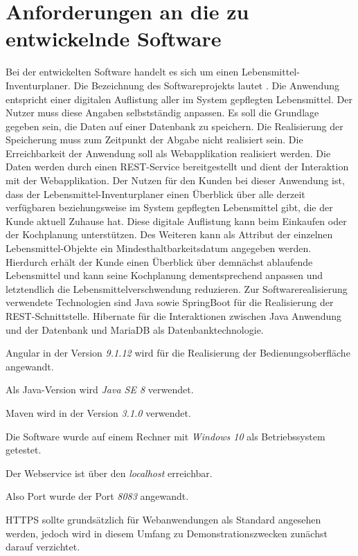 \section{Anforderungen an die zu entwickelnde Software}
Bei der entwickelten Software handelt es sich um einen Lebensmittel-Inventurplaner.
Die Bezeichnung des Softwareprojekts lautet .
Die Anwendung entspricht einer digitalen Auflistung aller im System gepflegten Lebensmittel. 
Der Nutzer muss diese Angaben selbstständig anpassen. 
Es soll die Grundlage gegeben sein, die Daten auf einer Datenbank zu speichern.
Die Realisierung der Speicherung muss zum Zeitpunkt der Abgabe nicht realisiert sein. 
Die Erreichbarkeit der Anwendung soll als Webapplikation realisiert werden.
Die Daten werden durch einen \ac{REST}-Service bereitgestellt und dient der Interaktion mit der Webapplikation.
Der Nutzen für den Kunden bei dieser Anwendung ist, dass der Lebensmittel-Inventurplaner einen Überblick über alle derzeit verfügbaren beziehungsweise im System gepflegten Lebensmittel gibt, die der Kunde aktuell Zuhause hat. 
Diese digitale Auflistung kann beim Einkaufen oder der Kochplanung unterstützen. 
Des Weiteren kann als Attribut der einzelnen Lebensmittel-Objekte ein Mindesthaltbarkeitsdatum angegeben werden. 
Hierdurch erhält der Kunde einen Überblick über demnächst ablaufende Lebensmittel und kann seine Kochplanung dementsprechend anpassen und letztendlich die Lebensmittelverschwendung reduzieren.
Zur Softwarerealisierung verwendete Technologien sind Java sowie SpringBoot für die Realisierung der \ac{REST}-Schnittstelle. Hibernate für die Interaktionen zwischen Java Anwendung und der Datenbank und MariaDB als Datenbanktechnologie. 

Angular in der Version \textit{9.1.12} wird für die Realisierung der Bedienungsoberfläche angewandt.

Als Java-Version wird \textit{Java SE 8} verwendet.

Maven wird in der Version \textit{3.1.0} verwendet.

Die Software wurde auf einem Rechner mit \textit{Windows 10} als Betriebssystem getestet.

Der Webservice ist über den \textit{localhost} erreichbar.

Also Port wurde der Port \textit{8083} angewandt.

\ac{HTTPS} sollte grundsätzlich für Webanwendungen als Standard angesehen werden, 
jedoch wird in diesem Umfang zu Demonstrationszwecken zunächst darauf verzichtet.

